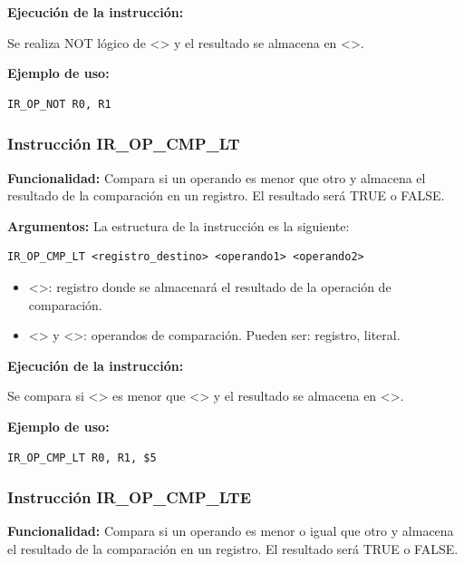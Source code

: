 \noindent
\textbf{Ejecución de la instrucción:}
\vspace{0.3cm}

\noindent
Se realiza NOT lógico de <> y el resultado se almacena en <>.
\vspace{0.3cm}

\noindent
\textbf{Ejemplo de uso:}
\begin{verbatim}
IR_OP_NOT R0, R1
\end{verbatim}


\subsubsection{Instrucción IR\_OP\_CMP\_LT}\label{subsubsec:IR_OP_CMP_LT}
\noindent
\textbf{Funcionalidad:} Compara si un operando es menor que otro y almacena el resultado de la comparación en un registro. El resultado será TRUE o FALSE.

\noindent
\textbf{Argumentos:} La estructura de la instrucción es la siguiente:
\begin{verbatim}
IR_OP_CMP_LT <registro_destino> <operando1> <operando2>
\end{verbatim}
\begin{itemize}
    \item <>: registro donde se almacenará el resultado de la operación de comparación.
    \item <> y <>: operandos de comparación. Pueden ser: registro, literal.
\end{itemize}

\noindent
\textbf{Ejecución de la instrucción:}
\vspace{0.3cm}

\noindent
Se compara si <> es menor que <> y el resultado se almacena en <>.
\vspace{0.3cm}

\noindent
\textbf{Ejemplo de uso:}
\begin{verbatim}
IR_OP_CMP_LT R0, R1, $5
\end{verbatim}

\subsubsection{Instrucción IR\_OP\_CMP\_LTE}\label{subsubsec:IR_OP_CMP_LTE}
\noindent
\textbf{Funcionalidad:} Compara si un operando es menor o igual que otro y almacena el resultado de la comparación en un registro. El resultado será TRUE o FALSE.

